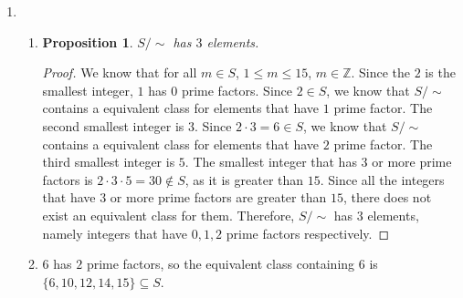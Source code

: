 \documentclass{article}
\newtheorem{prop}[thm]{Proposition}
\begin{document}
\begin{enumerate}
\begin{proof}
    Reflexive: Let $a \in A$. We will show that $a \approx a$. Since $\sim$ is an equivalent relation and $f(a) = f(a)$, we know that $f(a) \sim f(a)$ by the reflexive property. Therefore, since $f(a) \sim f(a)$, we have $a \approx a$.

    Symmetric: Let $a_1 \approx a_2$. We will show that $a_2 \approx a_1$. Since $a_1 \approx a_2$, we know that $f(a_1) \sim f(a_2)$. By the symmetric property of $\sim$, we have $f(a_2) \sim f(a_1)$, which shows that $a_2 \approx a_1$.

    Transitive: Let $a_1 \approx a_2$, $a_2 \approx a_3$. We will show that $a_1 \approx a_3$. Since $a_1 \approx a_2$, $a_2 \approx a_3$, we know that $f(a_1) \sim f(a_2)$ and $f(a_2) \sim f(a_3)$. By the transitive property of $\sim$, we have $f(a_1) \sim f(a_3)$, which shows that $a_1 \approx a_3$.

    Therefore, $\approx$ is an equivalent relation.
\end{proof}

\item 
\begin{enumerate}
    \item 
    \begin{prop}
        $S/\sim$ has $3$ elements.
    \end{prop}
    \begin{proof}
        We know that for all $m \in S$, $1 \leq m \leq 15$, $m \in \mathbb{Z}$. Since the $2$ is the smallest integer, $1$ has $0$ prime factors. Since $2 \in S$, we know that $S/\sim$ contains a equivalent class for elements that have $1$ prime factor. The second smallest integer is $3$. Since $2 \cdot 3  = 6 \in S$, we know that $S/\sim$ contains a equivalent class for elements that have $2$ prime factor. The third smallest integer is $5$. The smallest integer that has $3$ or more prime factors is $2\cdot3\cdot5 = 30 \notin S$, as it is greater than $15$. Since all the integers that have $3$ or more prime factors are greater than $15$, there does not exist an equivalent class for them. Therefore, $S/\sim$ has $3$ elements, namely integers that have $0, 1, 2$ prime factors respectively.
    \end{proof}

    \item 
    $6$ has $2$ prime factors, so the equivalent class containing $6$ is $\{6, 10, 12, 14, 15\} \subseteq S$.
\end{enumerate}


\end{enumerate}
\end{document}
